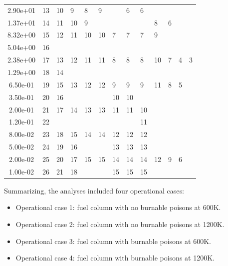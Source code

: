 \begin{table}[htbp!]
\begin{tabular}{S[table-format=2.2e-1]|llllllllllll}
  2.90e+01            & 13    & 10   & 9    & 8   & 9   &     & 6   & 6     &     &    &    &   \\ 
  1.37e+01            & 14    & 11   & 10   & 9   &     &     &     &       & 8   & 6  &    &   \\ 
  8.32e+00            & 15    & 12   & 11   & 10  & 10  & 7   & 7   & 7     & 9   &    &    &   \\ 
  5.04e+00            & 16    &      &      &     &     &     &     &       &     &    &    &   \\ 
  2.38e+00            & 17    & 13   & 12   & 11  & 11  & 8   & 8   & 8     & 10  & 7  & 4  & 3 \\ 
  1.29e+00            & 18    & 14   &      &     &     &     &     &       &     &    &    &   \\ 
  6.50e-01            & 19    & 15   & 13   & 12  & 12  & 9   & 9   & 9     & 11  & 8  & 5  &   \\ 
  3.50e-01            & 20    & 16   &      &     &     & 10  & 10  &       &     &    &    &   \\ 
  2.00e-01            & 21    & 17   & 14   & 13  & 13  & 11  & 11  & 10    &     &    &    &   \\ 
  1.20e-01            & 22    &      &      &     &     &     &     & 11    &     &    &    &   \\ 
  8.00e-02            & 23    & 18   & 15   & 14  & 14  & 12  & 12  & 12    &     &    &    &   \\ 
  5.00e-02            & 24    & 19   & 16   &     &     & 13  & 13  & 13    &     &    &    &   \\ 
  2.00e-02            & 25    & 20   & 17   & 15  & 15  & 14  & 14  & 14    & 12  & 9  & 6  &   \\ 
  1.00e-02            & 26    & 21   & 18   &     &     & 15  & 15  & 15    &     &    &    &   \\ 
  \bottomrule
  \end{tabular}
  \label{tab:energygroups}
\end{table}

Summarizing, the analyses included four operational cases: 
\begin{itemize}
  \item Operational case 1: fuel column with no burnable poisons at 600K.
  \item Operational case 2: fuel column with no burnable poisons at 1200K.
  \item Operational case 3: fuel column with burnable poisons at 600K.
  \item Operational case 4: fuel column with burnable poisons at 1200K.
\end{itemize}

